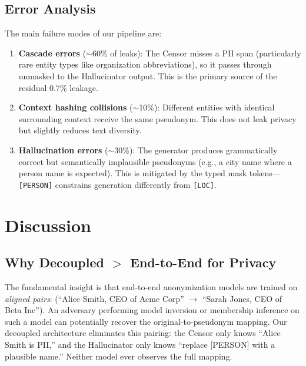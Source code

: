 \documentclass[11pt, a4paper]{article}
\begin{document}
\subsection{Error Analysis}

The main failure modes of our pipeline are:

\begin{enumerate}[leftmargin=*]
  \item \textbf{Cascade errors} ($\sim$60\% of leaks): The Censor
        misses a PII span (particularly rare entity types like
        organization abbreviations), so it passes through unmasked to
        the Hallucinator output.  This is the primary source of the
        residual 0.7\% leakage.
  \item \textbf{Context hashing collisions} ($\sim$10\%): Different
        entities with identical surrounding context receive the same
        pseudonym.  This does not leak privacy but slightly reduces
        text diversity.
  \item \textbf{Hallucination errors} ($\sim$30\%): The generator
        produces grammatically correct but semantically implausible
        pseudonyms (e.g., a city name where a person name is expected).
        This is mitigated by the typed mask tokens---\texttt{[PERSON]}
        constrains generation differently from \texttt{[LOC]}.
\end{enumerate}


\section{Discussion}
\label{sec:discussion}

\subsection{Why Decoupled $>$ End-to-End for Privacy}

The fundamental insight is that end-to-end anonymization models are
trained on \emph{aligned pairs}: (``Alice Smith, CEO of Acme Corp''
$\to$ ``Sarah Jones, CEO of Beta Inc'').  An adversary performing model
inversion or membership inference on such a model can potentially
recover the original-to-pseudonym mapping.  Our decoupled architecture
eliminates this pairing: the Censor only knows ``Alice Smith is PII,''
and the Hallucinator only knows ``replace [PERSON] with a plausible
name.''  Neither model ever observes the full mapping.
\end{document}
